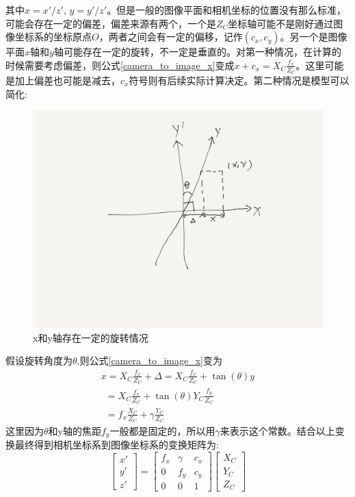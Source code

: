 \documentclass[12pt]{book}
\begin{document}
其中$x=x'/z'$, $y=y'/z'$。但是一般的图像平面和相机坐标的位置没有那么标准，可能会存在一定的偏差，偏差来源有两个，一个是$Z_C$坐标轴可能不是刚好通过图像坐标系的坐标原点$O$，两者之间会有一定的偏移，记作$(c_x, c_y)$。另一个是图像平面$x$轴和$y$轴可能存在一定的旋转，不一定是垂直的。对第一种情况，在计算的时候需要考虑偏差，则公式\ref{camera_to_image_x}变成$x + {c_x} = {X_C}\frac{{{f_x}}}{{{Z_C}}}$。这里可能是加上偏差也可能是减去，$c_x$符号则有后续实际计算决定。第二种情况是模型可以简化:
\begin{figure}[H]
	\centering
	\includegraphics[width=1.0\textwidth]{images/camera_to_image_with_rotation.jpg}
	\caption{x和y轴存在一定的旋转情况}
	\label{camera-to-image-with-rotation}
\end{figure}
假设旋转角度为$\theta $,则公式\ref{camera_to_image_x}变为
\begin{equation}\label{camera_to_image_with_rotation}
\begin{array}{l}
	x = {X_C}\frac{{{f_x}}}{{{Z_C}}} + \Delta  = {X_C}\frac{{{f_x}}}{{{Z_C}}} + \tan (\theta )y\\
	\ \ = {X_C}\frac{{{f_x}}}{{{Z_C}}} + \tan (\theta ){Y_C}\frac{{{f_y}}}{{{Z_C}}}\\
	\ \ = {f_x}\frac{{{X_C}}}{{{Z_C}}} + \gamma \frac{{{Y_C}}}{{{Z_C}}}
\end{array}
\end{equation}
这里因为$\theta$和y轴的焦距$f_y$一般都是固定的，所以用$\gamma$来表示这个常数。结合以上变换最终得到相机坐标系到图像坐标系的变换矩阵为:
\begin{equation}\label{camera_to_image}
\left[ {\begin{array}{*{20}{c}}
		{x'}\\
		{y'}\\
		{z'}
\end{array}} \right] = \left[ {\begin{array}{*{20}{c}}
		{{f_x}}&\gamma &{{c_x}}\\
		0&{{f_y}}&{{c_y}}\\
		0&0&1
\end{array}} \right]\left[ {\begin{array}{*{20}{c}}
		{{X_C}}\\
		{{Y_C}}\\
		{{Z_C}}
\end{array}} \right]
\end{equation}
\end{document}
